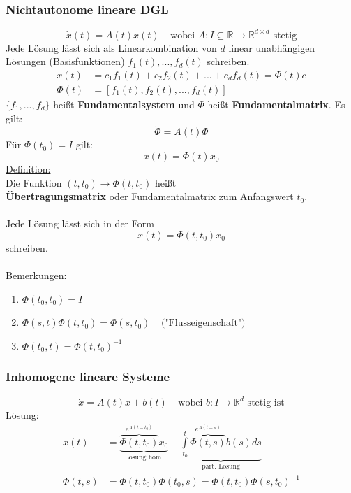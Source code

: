 \documentclass[a4paper,twocolumn,10pt]{article}
\begin{document}
\subsubsection{Nichtautonome lineare DGL}
\begin{equation*}
\dot{x}(t)=A(t)x(t)\;\;\;\;\text{wobei }A:I\subseteq\mathbb{R}\rightarrow\mathbb{R}^{d\times d}\text{ stetig}
\end{equation*}
Jede Lösung lässt sich als Linearkombination von $d$ linear  unabhängigen Lösungen (Basisfunktionen) $f_1(t),...,f_d(t)$ schreiben.
\begin{equation*}
\begin{split}
x(t)&=c_1f_1(t)+c_2f_2(t)+...+c_df_d(t)=\Phi (t)c\\
\Phi (t)&=[f_1(t),f_2(t),...,f_d(t)]
\end{split}
\end{equation*}
$\{f_1,...,f_d\}$ heißt \textbf{Fundamentalsystem} und $\Phi$ heißt \textbf{Fundamentalmatrix}. Es gilt:
\begin{equation*}
\dot{\Phi}=A(t)\Phi
\end{equation*}
Für $\Phi(t_0)=I$ gilt:
\begin{equation*}
x(t)=\Phi(t)x_0
\end{equation*}
\underline{Definition:}\\
Die Funktion $(t,t_0)\rightarrow\Phi(t,t_0)$ heißt\\ \textbf{Übertragungsmatrix} oder Fundamentalmatrix zum Anfangswert $t_0$.\\\\
Jede Lösung lässt sich in der Form
\begin{equation*}
x(t)=\Phi(t,t_0)x_0
\end{equation*}
schreiben.\\\\
\underline{Bemerkungen:}
\begin{enumerate}[label=$\bullet$]
\item $\Phi(t_0,t_0)=I$
\item $\Phi(s,t)\Phi(t,t_0)=\Phi(s,t_0)\;\;\;\;\text{("Flusseigenschaft")}$
\item $\Phi(t_0,t)=\Phi(t,t_0)^{-1}$
\end{enumerate}

\subsubsection{Inhomogene lineare Systeme}
\begin{equation*}
\dot{x}=A(t)x+b(t)\;\;\;\;\text{wobei }b:I\rightarrow\mathbb{R}^d\text{ stetig ist}
\end{equation*}
Lösung:
\begin{equation*}
\begin{split}
x(t)&=\underbrace{\overbrace{\Phi(t,t_0)}^{e^{A(t-t_0)}}x_0}_{\text{Lösung hom.}}+\underbrace{\int\limits_{t_0}^{t}\overbrace{\Phi(t,s)}^{e^{A(t-s)}}b(s)ds}_{\text{part. Lösung}}\\
\Phi(t,s)&=\Phi(t,t_0)\Phi(t_0,s)=\Phi(t,t_0)\Phi(s,t_0)^{-1}
\end{split}
\end{equation*}
\end{document}
